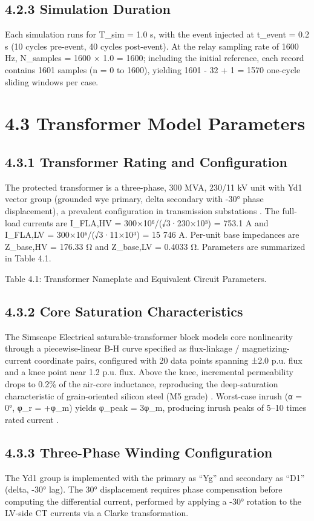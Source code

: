 \subsection{4.2.3  Simulation Duration}
Each simulation runs for T\_sim = 1.0 s, with the event injected at t\_event = 0.2 s (10 cycles pre-event, 40 cycles post-event). At the relay sampling rate of 1600 Hz, N\_samples = 1600 × 1.0 = 1600; including the initial reference, each record contains 1601 samples (n = 0 to 1600), yielding 1601 - 32 + 1 = 1570 one-cycle sliding windows per case.


\section{4.3  Transformer Model Parameters}

\subsection{4.3.1  Transformer Rating and Configuration}
The protected transformer is a three-phase, 300 MVA, 230/11 kV unit with Yd1 vector group (grounded wye primary, delta secondary with -30° phase displacement), a prevalent configuration in transmission substations \cite{ref5}. The full-load currents are I\_FLA,HV = 300×10⁶/(√3·230×10³) = 753.1 A and I\_FLA,LV = 300×10⁶/(√3·11×10³) = 15 746 A. Per-unit base impedances are Z\_base,HV = 176.33 Ω and Z\_base,LV = 0.4033 Ω. Parameters are summarized in Table 4.1.

Table 4.1: Transformer Nameplate and Equivalent Circuit Parameters.


\subsection{4.3.2  Core Saturation Characteristics}
The Simscape Electrical saturable-transformer block models core nonlinearity through a piecewise-linear B-H curve specified as flux-linkage / magnetizing-current coordinate pairs, configured with 20 data points spanning ±2.0 p.u. flux and a knee point near 1.2 p.u. flux. Above the knee, incremental permeability drops to 0.2\% of the air-core inductance, reproducing the deep-saturation characteristic of grain-oriented silicon steel (M5 grade) \cite{ref6}. Worst-case inrush (α = 0°, φ\_r = +φ\_m) yields φ\_peak = 3φ\_m, producing inrush peaks of 5--10 times rated current \cite{ref7}.


\subsection{4.3.3  Three-Phase Winding Configuration}
The Yd1 group is implemented with the primary as ``Yg'' and secondary as ``D1'' (delta, -30° lag). The 30° displacement requires phase compensation before computing the differential current, performed by applying a -30° rotation to the LV-side CT currents via a Clarke transformation.


